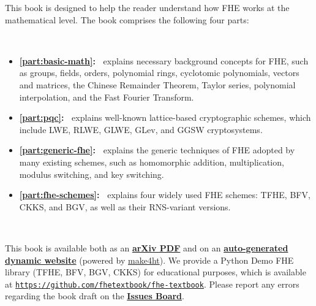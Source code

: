 \documentclass[11pt]{article}
\begin{document}
This book is designed to help the reader understand how FHE works at the mathematical level. The book comprises the following four parts: 

$ $

\begin{itemize}
\item \textbf{\autoref{part:basic-math}:~} explains necessary background concepts for FHE, such as groups, fields, orders, polynomial rings, cyclotomic polynomials, vectors and matrices, the Chinese Remainder Theorem, Taylor series, polynomial interpolation, and the Fast Fourier Transform.

\item \textbf{\autoref{part:pqc}:~} explains well-known lattice-based cryptographic schemes, which include LWE, RLWE, GLWE, GLev, and GGSW cryptosystems.

\item \textbf{\textbf{\autoref{part:generic-fhe}:~}} explains the generic techniques of FHE adopted by many existing schemes, such as homomorphic addition, multiplication, modulus switching, and key switching. 


\item \textbf{\textbf{\autoref{part:fhe-schemes}:~}} explains four widely used FHE schemes: TFHE, BFV, CKKS, and BGV, as well as their RNS-variant versions.
\end{itemize}

$ $



This book is available both as an \href{https://arxiv.org/abs/2503.05136}{\textbf{arXiv PDF}} and on an \href{https://fhetextbook.github.io} {\textbf{auto-generated dynamic website}} (powered by \href{https://www.kodymirus.cz/overleaf-html-sample/main.html}{make4ht}). We provide a Python Demo FHE library (TFHE, BFV, BGV, CKKS) for educational purposes, which is available at \href{https://github.com/fhetextbook/fhe-textbook}{\texttt{https://github.com/fhetextbook/fhe-textbook}}.
Please report any errors regarding the book draft on the \href{https://github.com/fhetextbook/fhe-textbook/issues}{\textbf{Issues Board}}.
\end{document}

